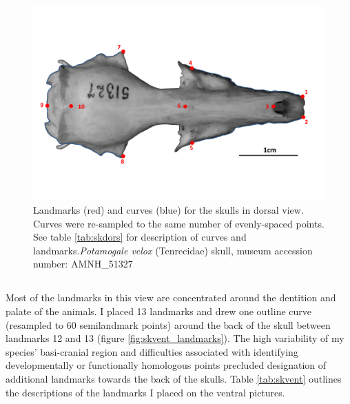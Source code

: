 
\begin{figure}[h]
	\centering
	\includegraphics[width=1\linewidth]{Methods/figures/AMNH_51327_dorsallandmarksdiagram.png}
	\caption[Skulls: dorsal landmarks]
	{Landmarks (red) and curves (blue) for the skulls in dorsal view. Curves were re-sampled to the same number of evenly-spaced points. See table \ref{tab:skdors} for description of curves and landmarks.\textit{Potamogale velox} (Tenrecidae) skull, museum accession number: AMNH\_51327}
	\label{fig:skdors_landmarks}
\end{figure}


\begin{table}[h]
	\caption[Skulls: dorsal landmarks]
		{Descriptions of the landmarks (points) and curves (semilandmarks) for the skulls in dorsal view (figure
		\ref{fig:skdors_landmarks})} 
	
	\label{tab:skdors}
\end{table}




\subsection{}

	Most of the landmarks in this view are concentrated around the dentition and palate of the animals. I placed 13 landmarks and drew one outline curve (resampled to 60 semilandmark points) around the back of the skull between landmarks 12 and 13 (figure \ref{fig:skvent_landmarks}). The high variability of my species’ basi-cranial region and difficulties associated with identifying developmentally or functionally homologous points precluded designation of additional landmarks towards the back of the skulls. Table \ref{tab:skvent} outlines the descriptions of the landmarks I placed on the ventral pictures.

